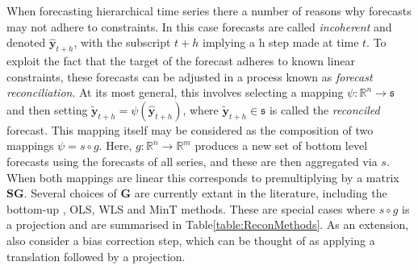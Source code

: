 \documentclass[12pt]{article}
\theoremstyle{definition}
\begin{document}
When forecasting hierarchical time series there a number of reasons why forecasts may not adhere to constraints. 
In this case forecasts are called {\em incoherent} and denoted $\hat{\bm y}_{t+h}$, with the subscript $t+h$ implying a h step made at time $t$.  To exploit the fact that the target of the forecast adheres to known linear constraints, these forecasts can be adjusted in a process known as {\em forecast reconciliation}.  At its most general, this involves selecting a mapping $\psi:\mathbb{R}^n\rightarrow\mathfrak{s}$ and then setting $\tilde{\bm y}_{t+h}=\psi(\hat{\bm y}_{t+h})$, where $\tilde{\bm y}_{t+h}\in\mathfrak{s}$ is called the {\em reconciled} forecast.  This mapping itself may be considered as the composition of two mappings $\psi=s\circ g$. Here, $g:\mathbb{R}^{n}\rightarrow\mathbb{R}^{m}$ produces a new set of bottom level forecasts using the forecasts of all series, and these are then aggregated via $s$.  When both mappings are linear this corresponds to premultiplying by a matrix $\bm{S}\bm{G}$.  Several choices of $\bm{G}$ are currently extant in the literature, including the bottom-up \citep{Dunn1976}, OLS, WLS and MinT \citep{HynEtAl2011,WicEtAl2019} methods. These are special cases where $s\circ g$ is a projection and are summarised in Table\ref{table:ReconMethods}.  As an extension, \cite{PanEtAl2019HF} also consider a bias correction step, which can be thought of as applying a translation followed by a projection.
\end{document}

